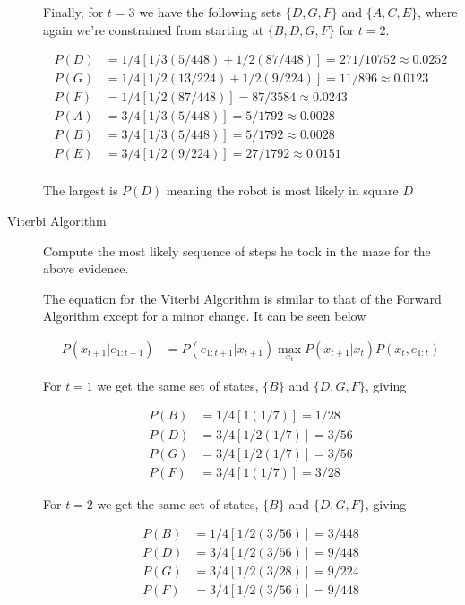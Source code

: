 \documentclass[12pt]{article}
\begin{document}
\begin{description}
Finally, for $t=3$ we have the following sets $\{D,G,F\}$ and $\{A, C, E\}$, where again we're constrained from starting at $\{B,D,G,F\}$ for $t=2$. 

\begin{align*}
  P(D) &= 1/4[1/3(5/448) + 1/2(87/448)] = 271/10752 \approx 0.0252\\
  P(G) &= 1/4[1/2(13/224) + 1/2(9/224)] = 11/896 \approx 0.0123\\
  P(F) &= 1/4[1/2(87/448)] = 87/3584 \approx 0.0243\\
  P(A) &= 3/4[1/3(5/448)] = 5/1792 \approx 0.0028\\
  P(B) &= 3/4[1/3(5/448)] = 5/1792 \approx 0.0028\\
  P(E) &= 3/4[1/2(9/224)] = 27/1792 \approx 0.0151\\
\end{align*}

The largest is $P(D)$ meaning the robot is most likely in square $D$

\item[Viterbi Algorithm] Compute the most likely sequence of steps he
  took in the maze for the above evidence.

The equation for the Viterbi Algorithm is similar to that of the Forward Algorithm except for a minor change. It can be seen below

\begin{align*}
  P(x_{t+1}|e_{1:t+1}) &= P(e_{1:t+1}|x_{t+1})\max_{x_{t}}P(x_{t+1}|x_{t})P(x_{t},e_{1:t})
\end{align*}

For $t=1$ we get the same set of states, $\{B\}$ and $\{D,G,F\}$, giving

\begin{align*}
  P(B) &= 1/4[1(1/7)] = 1/28\\
  P(D) &= 3/4[1/2(1/7)] = 3/56\\
  P(G) &= 3/4[1/2(1/7)] = 3/56\\
  P(F) &= 3/4[1(1/7)] = 3/28
\end{align*}

For $t=2$ we get the same set of states, $\{B\}$ and $\{D,G,F\}$, giving

\begin{align*}
  P(B) &= 1/4[1/2(3/56)] = 3/448\\
  P(D) &= 3/4[1/2(3/56)] = 9/448\\
  P(G) &= 3/4[1/2(3/28)] = 9/224\\
  P(F) &= 3/4[1/2(3/56)] = 9/448
\end{align*}


\end{description}
\end{document}
